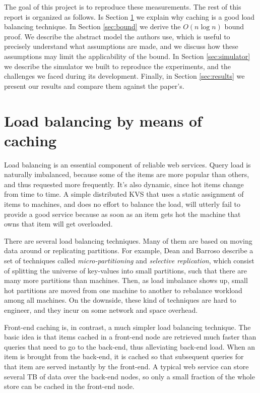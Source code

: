 \documentclass[10pt,letterpaper]{article}
\begin{document}
The goal of this project is to reproduce these measurements. The rest of this report is organized as follows. Is Section \ref{sec:caching} we explain why caching is a good load balancing technique. In Section \ref{sec:bound} we derive the $O(n \log n)$ bound proof. We describe the abstract model the authors use, which is useful to precisely understand what assumptions are made, and we discuss how these assumptions may limit the applicability of the bound. In Section \ref{sec:simulator} we describe the simulator we built to reproduce the experiments, and the challenges we faced during its development. Finally, in Section \ref{sec:results} we present our results and compare them against the paper's.

\section{Load balancing by means of caching}
\label{sec:caching}

Load balancing is an essential component of reliable web services. Query load is naturally imbalanced, because some of the items are more popular than others, and thus requested more frequently. It's also dynamic, since hot items change from time to time. A simple distributed KVS that uses a static assignment of items to machines, and does no effort to balance the load, will utterly fail to provide a good service because as soon as an item gets hot the machine that owns that item will get overloaded.

There are several load balancing techniques. Many of them are based on moving data around or replicating partitions. For example, Dean and Barroso \cite{Dean13} describe a set of techniques called \textit{micro-partitioning} and \textit{selective replication}, which consist of splitting the universe of key-values into small partitions, such that there are many more partitions than machines. Then, as load imbalance shows up, small hot partitions are moved from one machine to another to rebalance workload among all machines. On the downside, these kind of techniques are hard to engineer, and they incur on some network and space overhead.

Front-end caching is, in contrast, a much simpler load balancing technique. The basic idea is that items cached in a front-end node are retrieved much faster than queries that need to go to the back-end, thus alleviating back-end load. When an item is brought from the back-end, it is cached so that subsequent queries for that item are served instantly by the front-end. A typical web service can store several TB of data over the back-end nodes, so only a small fraction of the whole store can be cached in the front-end node.
\end{document}
